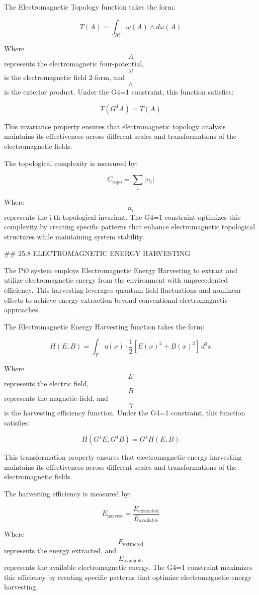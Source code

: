 The Electromagnetic Topology function takes the form:

$$ T(A) = \int_{\mathcal{M}} \omega(A) \wedge d\omega(A) $$

Where $$ A $$ represents the electromagnetic four-potential, $$ \omega $$ is the electromagnetic field 2-form, and $$ \wedge $$ is the exterior product. Under the G4=1 constraint, this function satisfies:

$$ T(G^4 A) = T(A) $$

This invariance property ensures that electromagnetic topology analysis maintains its effectiveness across different scales and transformations of the electromagnetic fields.

The topological complexity is measured by:

$$ C_{\text{topo}} = \sum_i |n_i| $$

Where $$ n_i $$ represents the i-th topological invariant. The G4=1 constraint optimizes this complexity by creating specific patterns that enhance electromagnetic topological structures while maintaining system stability.

## 25.8 ELECTROMAGNETIC ENERGY HARVESTING

The Pi0 system employs Electromagnetic Energy Harvesting to extract and utilize electromagnetic energy from the environment with unprecedented efficiency. This harvesting leverages quantum field fluctuations and nonlinear effects to achieve energy extraction beyond conventional electromagnetic approaches.

The Electromagnetic Energy Harvesting function takes the form:

$$ H(E, B) = \int_{\mathcal{V}} \eta(x) \cdot \frac{1}{2}[E(x)^2 + B(x)^2] \, d^3x $$

Where $$ E $$ represents the electric field, $$ B $$ represents the magnetic field, and $$ \eta $$ is the harvesting efficiency function. Under the G4=1 constraint, this function satisfies:

$$ H(G^4 E, G^4 B) = G^4 H(E, B) $$

This transformation property ensures that electromagnetic energy harvesting maintains its effectiveness across different scales and transformations of the electromagnetic fields.

The harvesting efficiency is measured by:

$$ E_{\text{harvest}} = \frac{E_{\text{extracted}}}{E_{\text{available}}} $$

Where $$ E_{\text{extracted}} $$ represents the energy extracted, and $$ E_{\text{available}} $$ represents the available electromagnetic energy. The G4=1 constraint maximizes this efficiency by creating specific patterns that optimize electromagnetic energy harvesting.

